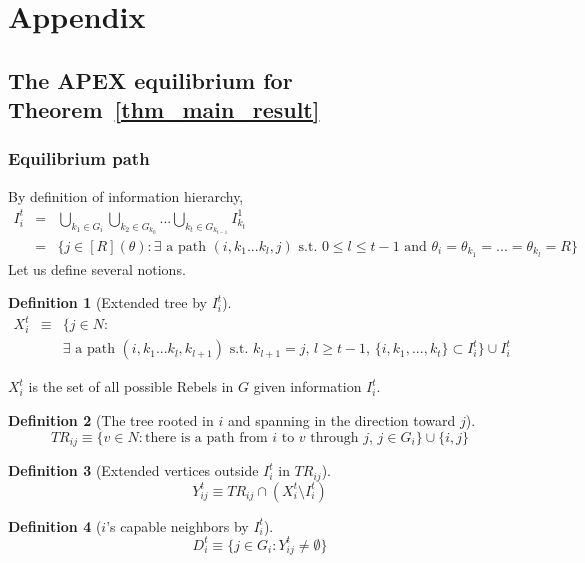 \documentclass[12pt,letter]{article}
\newtheorem{definition}{Definition}[section]
\theoremstyle{definition}
\theoremstyle{remark}
\theoremstyle{claim}
\begin{document}


\appendix
\section{Appendix}
\subsection{The APEX equilibrium for Theorem~\ref{thm_main_result}}
\subsubsection{Equilibrium path}
\label{sec:equilibrium_path}
By definition of information hierarchy, 
\begin{eqnarray*}
I^t_i & = & \bigcup_{k_1\in G_i}\bigcup_{k_2\in G_{k_0}}...\bigcup_{k_{t}\in G_{k_{t-1}}}I^1_{k_{t}}\\
&= & \{j\in [R](\theta): \text{$\exists$ a path $(i,k_1...k_{l},j)$ s.t.~$0\leq l\leq t-1$ and $\theta_i=\theta_{k_1}=...=\theta_{k_l}=R$}\}
\end{eqnarray*}
Let us define several notions.
\begin{definition}[Extended tree by $I^t_i$]
\label{def:ext_tree}
\begin{eqnarray*}
X^t_i & \equiv &  \{j\in N: \\
	& & \text{$\exists$ a path $(i,k_1...k_{l},k_{l+1})$ s.t.~$k_{l+1}=j$, $l\geq t-1$, $\{i,k_1,...,k_{t}\}\subset I^t_i$}\}\cup I^t_i
\end{eqnarray*}
\end{definition}
$X^t_i $ is the set of all possible Rebels in $G$ given information $I^t_i$. 

\begin{definition}[The tree rooted in $i$ and spanning in the direction toward $j$]
\[TR_{ij}\equiv \{v\in N:\text{there is a path from $i$ to $v$ through $j$, $j\in G_i$}\}\cup\{i,j\}\]
\end{definition}


\begin{definition}[Extended vertices outside $I^t_i$ in $TR_{ij}$]
\[Y^t_{ij}\equiv TR_{ij}\cap(X^t_i\setminus I^t_i)\]
\end{definition}


\begin{definition}[$i$'s capable neighbors by $I^t_i$]
\[D^t_{i}\equiv \{j\in G_i: Y^t_{ij}\neq \emptyset\}\]
\end{definition}
\end{document}
